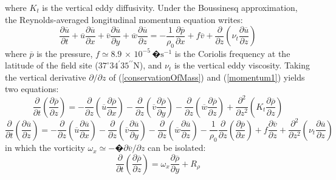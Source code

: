 where $K_{t}$ is the vertical eddy diffusivity. Under the Boussinesq approximation, the Reynolds-averaged longitudinal momentum equation writes:
\begin{equation}
\frac{\partial \overline{u}}{\partial t} + \overline{u} \frac{\partial \overline{u}}{\partial x} +  \overline{v} \frac{\partial \overline{u}}{\partial y} +  \overline{w} \frac{\partial \overline{u}}{\partial z} = -\frac{1}{\rho_0}\frac{\partial \overline{p}}{\partial x} + f\overline{v} + \frac{\partial}{\partial z}\left( \nu_{t} \frac{\partial \overline{u}}{\partial z} \right)
\label{momentum1}
\end{equation}
where $\overline{p}$ is the pressure, $f\simeq 8.9 \, \times \, 10^{-5} \,�\mathrm{s^{-1}}$ is the Coriolis frequency at the latitude of the field site ($37^{\circ}34^{\prime}35^{\prime \prime}$N), and $\nu_{t}$ is the vertical eddy viscosity. Taking the vertical derivative $\partial / \partial z$ of (\ref{conservationOfMass}) and (\ref{momentum1}) yields two equations:
\begin{equation}
\frac{\partial}{\partial t} \left( \frac{\partial \overline{\rho}}{\partial z} \right) = - \frac{\partial}{\partial z} \left(  \overline{u} \frac{\partial \overline{\rho}}{\partial x} \right) -\frac{\partial}{\partial z} \left( \overline{v} \frac{\partial \overline{\rho}}{\partial y} \right) - \frac{\partial}{\partial z} \left( \overline{w} \frac{\partial \overline{\rho}}{\partial z} \right) + \frac{\partial^2}{\partial z^2}\left( K_{t} \frac{\partial \overline{\rho}}{\partial z} \right)
\label{ddz_com}
\end{equation}
\begin{equation}
\frac{\partial}{\partial t} \left( \frac{\partial \overline{u}}{\partial z} \right) = - \frac{\partial}{\partial z} \left(  \overline{u} \frac{\partial \overline{u}}{\partial x} \right) -\frac{\partial}{\partial z} \left( \overline{v} \frac{\partial \overline{u}}{\partial y} \right) - \frac{\partial}{\partial z} \left( \overline{w} \frac{\partial \overline{u}}{\partial z} \right)  -\frac{1}{\rho_0} \frac{\partial}{\partial z}\left(\frac{\partial \overline{p}}{\partial x}\right) + f\frac{\partial \overline{v}}{\partial z} + \frac{\partial^2}{\partial z^2}\left( \nu_{t} \frac{\partial \overline{u}}{\partial z} \right)
\label{ddz_momentum}
\end{equation}
in which the vorticity $\omega_x \simeq -�\partial \overline{v}/\partial z$ can be isolated:
\begin{equation}
\frac{\partial}{\partial t} \left( \frac{\partial \overline{\rho}}{\partial z} \right) = \omega_x \frac{\partial \overline{\rho}}{\partial y} + R_\rho
\label{ddz_comV2}
\end{equation}
